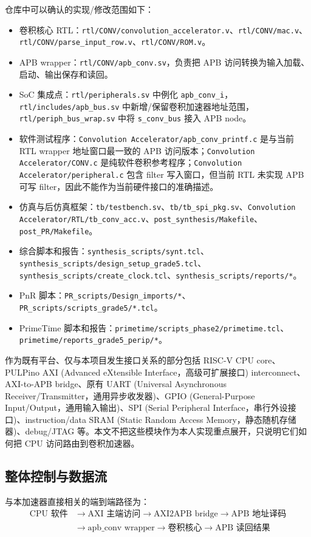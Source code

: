 ﻿\documentclass[UTF8,a4paper,11pt]{ctexart}
\newcommand{\fpath}[1]{\nolinkurl{#1}}
\newcommand{\reg}[1]{\ifmmode\text{\ttfamily #1}\else\texttt{#1}\fi}
\begin{document}
仓库中可以确认的实现/修改范围如下：
\begin{itemize}
  \item 卷积核心 RTL：\fpath{rtl/CONV/convolution_accelerator.v}、\fpath{rtl/CONV/mac.v}、\fpath{rtl/CONV/parse_input_row.v}、\fpath{rtl/CONV/ROM.v}。
  \item APB wrapper：\fpath{rtl/CONV/apb_conv.sv}，负责把 APB 访问转换为输入加载、启动、输出保存和读回。
  \item SoC 集成点：\fpath{rtl/peripherals.sv} 中例化 \reg{apb\_conv\_i}，\fpath{rtl/includes/apb_bus.sv} 中新增/保留卷积加速器地址范围，\fpath{rtl/periph_bus_wrap.sv} 中将 \reg{s\_conv\_bus} 接入 APB node。
  \item 软件测试程序：\fpath{Convolution Accelerator/apb_conv_printf.c} 是与当前 RTL wrapper 地址窗口最一致的 APB 访问版本；\fpath{Convolution Accelerator/CONV.c} 是纯软件卷积参考程序；\fpath{Convolution Accelerator/peripheral.c} 包含 filter 写入窗口，但当前 RTL 未实现 APB 可写 filter，因此不能作为当前硬件接口的准确描述。
  \item 仿真与后仿真框架：\fpath{tb/testbench.sv}、\fpath{tb/tb_spi_pkg.sv}、\fpath{Convolution Accelerator/RTL/tb_conv_acc.v}、\fpath{post_synthesis/Makefile}、\fpath{post_PR/Makefile}。
  \item 综合脚本和报告：\fpath{synthesis_scripts/synt.tcl}、\fpath{synthesis_scripts/design_setup_grade5.tcl}、\fpath{synthesis_scripts/create_clock.tcl}、\fpath{synthesis_scripts/reports/*}。
  \item PnR 脚本：\fpath{PR_scripts/Design_imports/*}、\fpath{PR_scripts/scripts_grade5/*.tcl}。
  \item PrimeTime 脚本和报告：\fpath{primetime/scripts_phase2/primetime.tcl}、\fpath{primetime/reports_grade5_perip/*}。
\end{itemize}

作为既有平台、仅与本项目发生接口关系的部分包括 RISC-V CPU core、PULPino AXI (Advanced eXtensible Interface，高级可扩展接口) interconnect、AXI-to-APB bridge、原有 UART (Universal Asynchronous Receiver/Transmitter，通用异步收发器)、GPIO (General-Purpose Input/Output，通用输入输出)、SPI (Serial Peripheral Interface，串行外设接口)、instruction/data SRAM (Static Random Access Memory，静态随机存储器)、debug/JTAG 等。本文不把这些模块作为本人实现重点展开，只说明它们如何把 CPU 访问路由到卷积加速器。

\subsection{整体控制与数据流}
与本加速器直接相关的端到端路径为：
\[
\begin{aligned}
\text{CPU 软件}
&\rightarrow \text{AXI 主端访问}
 \rightarrow \text{AXI2APB bridge}
 \rightarrow \text{APB 地址译码} \\
&\rightarrow \text{apb\_conv wrapper}
 \rightarrow \text{卷积核心}
 \rightarrow \text{APB 读回结果}
\end{aligned}
\]
\end{document}

